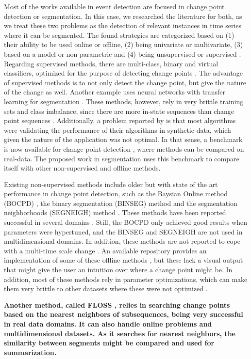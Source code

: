 Most of the works available in event detection are focused in change point detection or segmentation. In this case, we researched the literature for both, as we treat these two problems as the detection of relevant instances in time series where it can be segmented. The found strategies are categorized based on (1) their ability to be used online or offline, (2) being univariate or multivariate, (3) based on a model or non-parametric and (4) being unsupervised or supervised \cite{cpd_alan, review_1, review_2}. Regarding supervised methods, there are multi-class, binary and virtual classifiers, optimized for the purpose of detecting change points \cite{review_1}. The advantage of supervised methods is to not only detect the change point, but give the nature of the change as well. Another example uses neural networks with transfer learning for segmentation \cite{pedromatias}. These methods, however, rely in very brittle training sets and class imbalance, since there are more in-state sequences than change point sequences \cite{review_1}. Additionally, a problem reported by \cite{cpd_alan} is that most algorithms were validating the performance of their algorithms in synthetic data, which given the nature of the application was not optimal. In that sense, a benchmark is now available for change point detection \cite{cpd_alan}, where methods can be compared on real-data. The proposed work in segmentation uses this benchmark to compare itself with other non-supervised and offline methods.
\par
Existing non-supervised methods include older but with state of the art performance in change point detection, such as the Baysian Online method (BOCPD) \cite{bocpd}, the binary segmentation (BINSEG) method \cite{binseg} and the segmentation neighborhoods (SEGNEIGH) method \cite{segneigh}. These methods have been reported successful in several domains \cite{cpd_alan}. Still, the BOCPD only achieved good results when parameters were hypertuned, and the BINSEG and SEGNEIGH are not used in multidimensional domains. In addition, these methods are not reported to cope with a multi-time scale change \cite{cpd_alan}. An available repository provides an implementation of some of these offline methods \cite{review_2}, but these lack a visual output that might give the user an intuition over where a change point might be. In addition, most of these methods rely in parameter optimizations, which can make them very brittle to other datasets where these were not optimized \cite{eamonn1}.
\par
\textbf{Another method, called FLOSS \cite{eamonn1}, relies in searching change points based on the nearest neighbors of subsequences, being very successful in real data domains. It can also handle online problems and multidimensional datasets. As it searches for nearest neighbors, the similarity between segments might be compared and used for summarization.}

